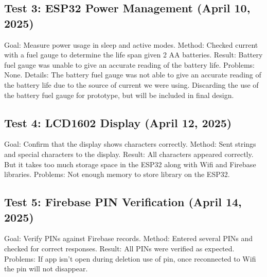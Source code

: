 \documentclass{article}
\begin{document}
\subsection*{Test 3: ESP32 Power Management (April 10, 2025)}
Goal: Measure power usage in sleep and active modes.
Method: Checked current with a fuel gauge to determine the life span given 2 AA batteries.
Result: Battery fuel gauge was unable to give an accurate reading of the battery life.
Problems: None.
Details: The battery fuel gauge was not able to give an accurate reading of the battery life due to the source of current we were using. Discarding the use of the battery fuel gauge for prototype, but will be included in final design.

\subsection*{Test 4: LCD1602 Display (April 12, 2025)}
Goal: Confirm that the display shows characters correctly.
Method: Sent strings and special characters to the display.
Result: All characters appeared correctly. But it takes too much storage space in the ESP32 along with Wifi and Firebase libraries.
Problems: Not enough memory to store library on the ESP32.

\subsection*{Test 5: Firebase PIN Verification (April 14, 2025)}
Goal: Verify PINs against Firebase records.
Method: Entered several PINs and checked for correct responses.
Result: All PINs were verified as expected.
Problems: If app isn't open during deletion use of pin, once reconnected to Wifi the pin will not disappear.
\end{document}
